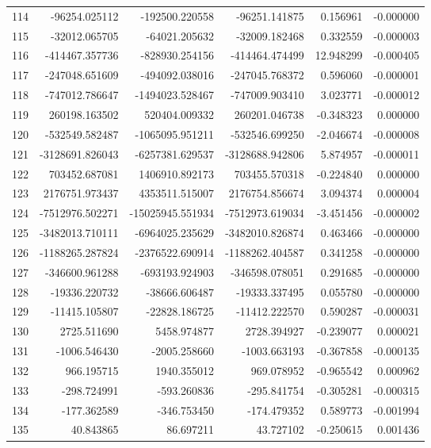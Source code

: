 \begin{tabular}{lrrrrr}
114 & -96254.025112 & -192500.220558 & -96251.141875 & 0.156961 & -0.000000 \\
115 & -32012.065705 & -64021.205632 & -32009.182468 & 0.332559 & -0.000003 \\
116 & -414467.357736 & -828930.254156 & -414464.474499 & 12.948299 & -0.000405 \\
117 & -247048.651609 & -494092.038016 & -247045.768372 & 0.596060 & -0.000001 \\
118 & -747012.786647 & -1494023.528467 & -747009.903410 & 3.023771 & -0.000012 \\
119 & 260198.163502 & 520404.009332 & 260201.046738 & -0.348323 & 0.000000 \\
120 & -532549.582487 & -1065095.951211 & -532546.699250 & -2.046674 & -0.000008 \\
121 & -3128691.826043 & -6257381.629537 & -3128688.942806 & 5.874957 & -0.000011 \\
122 & 703452.687081 & 1406910.892173 & 703455.570318 & -0.224840 & 0.000000 \\
123 & 2176751.973437 & 4353511.515007 & 2176754.856674 & 3.094374 & 0.000004 \\
124 & -7512976.502271 & -15025945.551934 & -7512973.619034 & -3.451456 & -0.000002 \\
125 & -3482013.710111 & -6964025.235629 & -3482010.826874 & 0.463466 & -0.000000 \\
126 & -1188265.287824 & -2376522.690914 & -1188262.404587 & 0.341258 & -0.000000 \\
127 & -346600.961288 & -693193.924903 & -346598.078051 & 0.291685 & -0.000000 \\
128 & -19336.220732 & -38666.606487 & -19333.337495 & 0.055780 & -0.000000 \\
129 & -11415.105807 & -22828.186725 & -11412.222570 & 0.590287 & -0.000031 \\
130 & 2725.511690 & 5458.974877 & 2728.394927 & -0.239077 & 0.000021 \\
131 & -1006.546430 & -2005.258660 & -1003.663193 & -0.367858 & -0.000135 \\
132 & 966.195715 & 1940.355012 & 969.078952 & -0.965542 & 0.000962 \\
133 & -298.724991 & -593.260836 & -295.841754 & -0.305281 & -0.000315 \\
134 & -177.362589 & -346.753450 & -174.479352 & 0.589773 & -0.001994 \\
135 & 40.843865 & 86.697211 & 43.727102 & -0.250615 & 0.001436 \\

\end{tabular}
